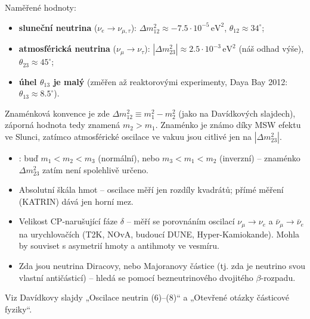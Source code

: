 Naměřené hodnoty:
\begin{itemize}[nosep]
  \item \textbf{sluneční neutrina} (\(\nu_e\to\nu_{\mu,\tau}\)):
  \(\Delta m^2_{12}\approx-7.5\cdot10^{-5}\,\mathrm{eV^2}\), \quad \(\theta_{12}\approx34^\circ\);
  \item \textbf{atmosférická neutrina} (\(\nu_\mu\to\nu_\tau\)):
  \(|\Delta m^2_{23}|\approx2.5\cdot10^{-3}\,\mathrm{eV^2}\) (náš odhad výše), \(\theta_{23}\approx45^\circ\);
  \item \textbf{úhel \(\theta_{13}\) je malý} (změřen až reaktorovými experimenty, Daya Bay 2012: \(\theta_{13}\approx8.5^\circ\)).
\end{itemize}
Znaménková konvence je zde \(\Delta m^2_{12}\equiv m_1^2-m_2^2\) (jako na Davídkových slajdech), záporná hodnota tedy znamená \(m_2>m_1\). Znaménko je známo díky MSW efektu ve Slunci, zatímco atmosférické oscilace ve vakuu jsou citlivé jen na \(|\Delta m^2_{23}|\).

\begin{vysvetleni}
\begin{itemize}[nosep,leftmargin=*]
  \item {}: buď \(m_1<m_2<m_3\) (normální), nebo \(m_3<m_1<m_2\) (inverzní) -- znaménko \(\Delta m^2_{23}\) zatím není spolehlivě určeno.
  \item Absolutní škála hmot -- oscilace měří jen rozdíly kvadrátů; přímé měření (KATRIN) dává jen horní mez.
  \item Velikost CP-narušující fáze \(\delta\) -- měří se porovnáním oscilací \(\nu_\mu\to\nu_e\) a \(\bar\nu_\mu\to\bar\nu_e\) na urychlovačích (T2K, NOvA, budoucí DUNE, Hyper-Kamiokande). Mohla by souviset s asymetrií hmoty a antihmoty ve vesmíru.
  \item Zda jsou neutrina Diracovy, nebo Majoranovy částice (tj. zda je neutrino svou vlastní antičásticí) -- hledá se pomocí bezneutrinového dvojitého \(\beta\)-rozpadu.
\end{itemize}
Viz Davídkovy slajdy „Oscilace neutrin (6)--(8)“ a „Otevřené otázky částicové fyziky“.
\end{vysvetleni}
